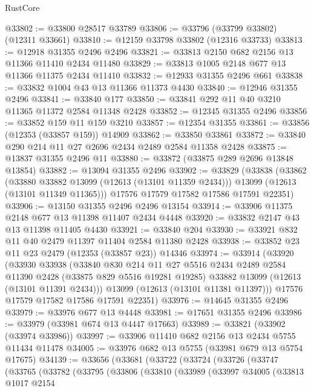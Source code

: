\begin{lexlean}{RustCore}
\begin{coremodule}
@33802 := @33800 @28517 @33789
@33806 := @33796 (@33799 @33802) (@12311 @33661)
@33810 := @12159 @33798 @33802 (@12316 @33733)
@33813 := @12918 @31355 @2496 @2496
@33821 := @33813 @2150 @682 @2156 @13 @11366 @11410 @2434 @11480
@33829 := @33813 @1005 @2148 @677 @13 @11366 @11375 @2434 @11410
@33832 := @12933 @31355 @2496 @661
@33838 := @33832 @1004 @43 @13 @11366 @11373 @4430
@33840 := @12946 @31355 @2496
@33841 := @33840 @177
@33850 := @33841 @292 @11 @40 @3210 @11365 @11372 @2584 @11348 @2428
@33852 := @12345 @31355 @2496
@33856 := @33852 @159 @11 @159 @3210
@33857 := @12354 @31355
@33861 := @33856 (@12353 (@33857 @159)) @14909
@33862 := @33850 @33861
@33872 := @33840 @290 @214 @11 @27 @2696 @2434 @2489 @2584 @11358 @2428
@33875 := @13837 @31355 @2496 @11
@33880 := @33872 (@33875 @289 @2696 @13848 @13854)
@33882 := @13094 @31355 @2496
@33902 := @33829
    (@33838
      (@33862
        (@33880 @33882 @13099 (@12613 (@13101 @11359 @2434)))
        @13099
        (@12613 (@13101 @11349 @11365)))
      @17576
      @17579
      @17582
      @17586
      @17591
      @22351)
@33906 := @13150 @31355 @2496 @2496 @13154
@33914 := @33906 @11375 @2148 @677 @13 @11398 @11407 @2434 @4448
@33920 := @33832 @2147 @43 @13 @11398 @11405 @4430
@33921 := @33840 @204
@33930 := @33921 @832 @11 @40 @2479 @11397 @11404 @2584 @11380 @2428
@33938 := @33852 @23 @11 @23 @2479 (@12353 (@33857 @23)) @14346
@33974 := @33914
    (@33920
      (@33930
        @33938
        (@33840
          @830
          @214
          @11
          @27
          @5516
          @2434
          @2489
          @2584
          @11390
          @2428
          (@33875 @829 @5516 @19281 @19285)
          @33882
          @13099
          (@12613 (@13101 @11391 @2434)))
        @13099
        (@12613 (@13101 @11381 @11397)))
      @17576
      @17579
      @17582
      @17586
      @17591
      @22351)
@33976 := @14645 @31355 @2496
@33979 := @33976 @677 @13 @4448
@33981 := @17651 @31355 @2496
@33986 := @33979 (@33981 @674 @13 @4447 @17663)
@33989 := @33821 (@33902 (@33974 @33986))
@33997 := @33906 @11410 @682 @2156 @13 @2434 @5755 @11434 @11478
@34005 := @33976 @682 @13 @5755 (@33981 @679 @13 @5754 @17675)
@34139 := @33656
    (@33681
      (@33722
        (@33724
          (@33726
            (@33747
              (@33765
                (@33782
                  (@33795
                    (@33806
                      (@33810
                        (@33989
                          (@33997
                            @34005
                            (@33813
                              @1017
                              @2154

\end{coremodule}
\end{lexlean}
